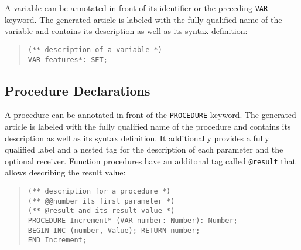 A variable can be annotated in front of its identifier or the preceding \texttt{VAR} keyword.
The generated article is labeled with the fully qualified name of the variable and contains its description as well as its syntax definition:

\begin{quote}\begin{verbatim}
(** description of a variable *)
VAR features*: SET;
\end{verbatim}\end{quote}

\subsection{Procedure Declarations}

A procedure can be annotated in front of the \texttt{PROCEDURE} keyword.
The generated article is labeled with the fully qualified name of the procedure and contains its description as well as its syntax definition.
It additionally provides a fully qualified label and a nested tag for the description of each parameter and the optional receiver.
Function procedures have an additonal tag called \texttt{@result} that allows describing the result value:

\begin{quote}\begin{verbatim}
(** description for a procedure *)
(** @@number its first parameter *)
(** @result and its result value *)
PROCEDURE Increment* (VAR number: Number): Number;
BEGIN INC (number, Value); RETURN number;
END Increment;
\end{verbatim}\end{quote}

